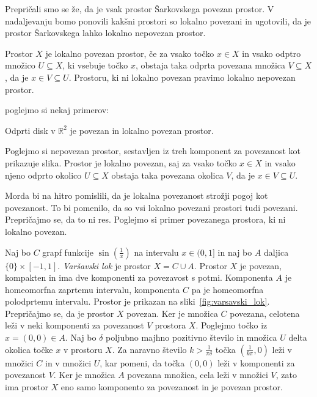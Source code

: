 \documentclass[mat2]{fmfdelo}
\newcommand{\R}{\mathbb R}
\begin{document}
Prepričali smo se že, da je vsak prostor Šarkovskega povezan prostor. V nadaljevanju bomo ponovili kakšni prostori so lokalno povezani in ugotovili, da je prostor Šarkovskega lahko lokalno nepovezan prostor.

\begin{definicija}
Prostor $X$ je lokalno povezan prostor, če za vsako točko $x \in X$ in vsako odptro množico $U \subseteq X$, ki vsebuje točko $x$, obstaja taka odprta povezana množica $V \subseteq X$, da je $x \in V \subseteq U$. Prostoru, ki ni lokalno povezan pravimo lokalno nepovezan prostor.
\end{definicija}

poglejmo si nekaj primerov:
\begin{primer}
Odprti disk v $\R^2$ je povezan in lokalno povezan prostor.
\end{primer}

\begin{primer}
Poglejmo si nepovezan prostor, sestavljen iz treh komponent za povezanost kot prikazuje slika. Prostor je lokalno povezan, saj za vsako točko $x \in X$ in vsako njeno odprto okolico $U\subseteq X$ obstaja taka povezana okolica $V$, da je $x \in V \subseteq U$.
\end{primer}

Morda bi na hitro pomislili, da je lokalna povezanost strožji pogoj kot povezanost. To bi pomenilo, da so vsi lokalno povezani prostori tudi povezani. Prepričajmo se, da to ni res. Poglejmo si primer povezanega prostora, ki ni lokalno povezan.

\begin{primer}
Naj bo $C$ grapf funkcije $\sin\left(\frac{1}{x}\right)$ na intervalu $x \in (0 , 1]$ in naj bo $A$ daljica $\{ 0 \} \times [-1 , 1]$. \emph{Varšavski lok} je prostor $X = C \cup A$.
Prostor $X$ je povezan, kompakten in ima dve komponenti za povezavost s potmi. Komponenta $A$ je homeomorfna zaprtemu intervalu, komponenta $C$ pa je homeomorfna polodprtemu intervalu. Prostor je prikazan na sliki~\ref{fig:varsavski_lok}.
Prepričajmo se, da je prostor $X$ povezan. Ker je množica $C$ povezana, celotena leži v neki komponenti za povezanost $V$ prostora $X$. Poglejmo točko iz $x = (0, 0) \in  A$. Naj bo $\delta$ poljubno majhno pozitivno število in množica $U$ delta okolica točke $x$ v prostoru $X$. Za naravno število $k > \frac{1}{\pi \delta}$ točka $(\frac{1}{k \pi}, 0)$ leži v množici $C$ in v množici $U$, kar pomeni, da točka $(0, 0)$ leži v komponenti za povezanost $V$. Ker je množica $A$ povezana množica, cela leži v množici $V$, zato ima prostor $X$ eno samo komponento za povezanost in je povezan prostor.
\end{primer}
\end{document}
